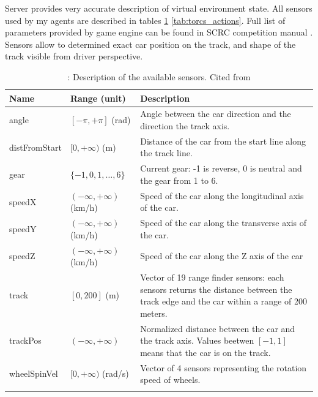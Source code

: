 \documentclass[declaration,shortabstract,english,inz]{iithesis}
\begin{document}
Server provides very accurate description of virtual environment state.
All sensors used by my agents are described in tables \ref{tab:torcs_sensors} \ref{tab:torcs_actions}.
Full list of parameters provided by game engine can be found in SCRC competition manual \cite{scrc_manual}. Sensors allow to determined exact car position on the track, and shape of the track visible from driver perspective.


\begin{center}
    \begin{longtable}{ | p{} |p{}| p{} |}
     \hline
     \textbf{Name} & \textbf{Range (unit)} & \textbf{Description} \\ 
     \hline
     angle & $[-\pi, +\pi]$ (rad) & Angle between the car direction and the direction the track axis. \\  
     \hline
     distFromStart & $[0, +\infty)$ (m) & Distance of the car from the start line along the track line. \\
     \hline
     gear & $ \{ -1,0,1, \dots, 6 \} $ & Current gear: -1 is reverse, 0 is neutral and the gear from 1 to 6. \\
     \hline
     speedX & $ ( -\infty, +\infty ) $ (km/h) & Speed of the car along the longitudinal axis of the car. \\
     \hline
     speedY & $ ( -\infty, +\infty ) $ (km/h) & Speed of the car along the transverse axis of the car. \\
     \hline
     speedZ & $ ( -\infty, +\infty ) $ (km/h) & Speed of the car along the Z axis of the car \\
     \hline        
     track &  $[0, 200]$ (m) & Vector of 19 range finder sensors: each sensors returns the distance between the track edge and the car within a range of 200 meters. \\
     \hline
     trackPos & $( -\infty, +\infty )$ & Normalized distance between the car and the track axis. Values beetwen $[-1, 1]$ means that the car is on the track. \\
     \hline
     wheelSpinVel & $[0, +\infty)$ (rad/s) & Vector of 4 sensors representing the rotation speed of wheels. \\
     \hline
     \caption{\label{tab:torcs_sensors}: Description of the available sensors. Cited from \cite{scrc_manual}}
    \end{longtable}

\end{center}
\end{document}
